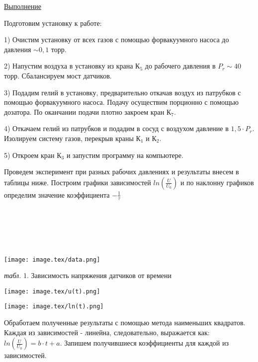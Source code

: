 \documentclass{article}
\begin{document}
\begin{center}
    \raggedleft
    {
        \large{\underline{Выполнение}}
    }
\end{center}
Подготовим установку к работе:

1) Очистим установку от всех газов с помощью форвакуумного насоса до давления \(\sim 0,1 \) торр.

2) Напустим воздуха в установку из крана К\(_{5}\) до рабочего давления в \(P_{r} \sim 40\) торр. Сбалансируем мост датчиков.

3) Подадим гелий в установку, предварительно откачав воздух из патрубков с помощью форвакуумного насоса. Подачу осуществим порционно с помощью дозатора. По оканчании подачи плотно закроем кран К\(_{7}\).

4) Откачаем гелий из патрубков и подадим в сосуд с воздухом давление в \(1,5\cdot P_{r}\). Изолируем систему газов, перекрыв краны К\(_{1}\) и К\(_{2}\).

5) Откроем кран К\(_{3}\) и запустим программу на компьютере.

Проведем эксперимент при разных рабочих давлениях и результаты внесем в таблицы ниже. Построим графики зависимостей \(ln(\frac{U}{U_{0}})\) и по наклонну графиков определим значение коэффициента \(-\frac{1}{\tau}\)
\\
\\
\\
\\
\\
\\
\begin{center}
    \centering
    \texttt{[image: image.tex/data.png]}

    \textit{табл.} 1. Зависимость напряжения датчиков от времени
\end{center}

\begin{center}
    \centering
    \texttt{[image: image.tex/u(t).png]}
\end{center}

\begin{center}
    \centering
    \texttt{[image: image.tex/ln(t).png]}
\end{center}

Обработаем полученные результаты с помощью метода наименьших квадратов. Каждая из зависимостей - линейна, следовательно, выражается как: \(ln(\frac{U}{U_{0}}) = b \cdot t + a\). Запишем получившиеся коэффициенты для каждой из зависимостей.
\end{document}
